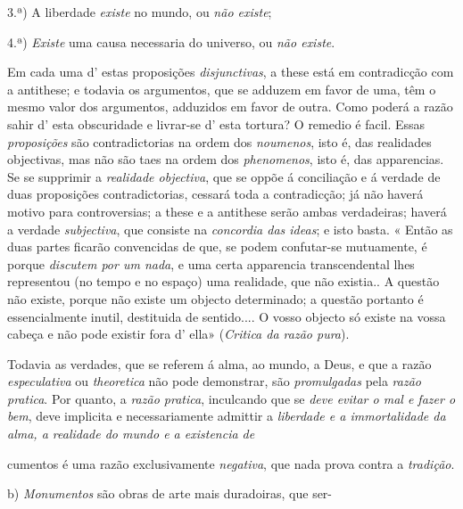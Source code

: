 3.ª) A liberdade \emph{existe} no mundo, ou \emph{não existe};

4.ª) \emph{Existe} uma causa necessaria do universo, ou \emph{não existe}.

Em cada uma d' estas proposições \emph{disjunctivas}, a these está em contradicção com a antithese; e todavia os argumentos, que se adduzem em favor de uma, têm o mesmo valor dos argumentos, adduzidos em favor de outra. Como poderá a razão sahir d' esta obscuridade e livrar-se d' esta tortura? O remedio é facil. Essas \emph{proposições} são contradictorias na ordem dos \emph{noumenos}, isto é, das realidades objectivas, mas não são taes na ordem dos \emph{phenomenos}, isto é, das apparencias. Se se supprimir a \emph{realidade objectiva}, que se oppõe á conciliação e á verdade de duas proposições contradictorias, cessará toda a contradicção; já não haverá motivo para controversias; a these e a antithese serão ambas verdadeiras; haverá a verdade \emph{subjectiva}, que consiste na \emph{concordia das ideas}; e isto basta. « Então as duas partes ficarão convencidas de que, se podem confutar-se mutuamente, é porque \emph{discutem por um nada}, e uma certa apparencia transcendental lhes representou (no tempo e no espaço) uma realidade, que não existia.. A questão não existe, porque não existe um objecto determinado; a questão portanto é essencialmente inutil, destituida de sentido.... O vosso objecto só existe na vossa cabeça e não pode existir fora d' ella» (\emph{Critica da razão pura}).

Todavia as verdades, que se referem á alma, ao mundo, a Deus, e que a razão \emph{especulativa} ou \emph{theoretica} não pode demonstrar, são \emph{promulgadas} pela \emph{razão pratica}. Por quanto, a \emph{razão pratica}, inculcando que se \emph{deve evitar o mal e fazer o bem}, deve implicita e necessariamente admittir a \emph{liberdade e a immortalidade da alma, a realidade do mundo e a existencia de}

cumentos é uma razão exclusivamente \emph{negativa}, que nada prova contra a \emph{tradição}.

b) \emph{Monumentos} são obras de arte mais duradoiras, que ser-

